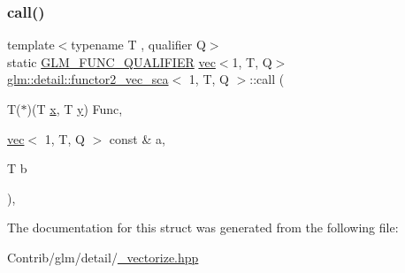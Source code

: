 \subsubsection{\texorpdfstring{call()}{call()}}
{\footnotesize\ttfamily template$<$typename T , qualifier Q$>$ \\
static \mbox{\hyperlink{setup_8hpp_a33fdea6f91c5f834105f7415e2a64407}{G\+L\+M\+\_\+\+F\+U\+N\+C\+\_\+\+Q\+U\+A\+L\+I\+F\+I\+ER}} \mbox{\hyperlink{structglm_1_1vec}{vec}}$<$1, T, Q$>$ \mbox{\hyperlink{structglm_1_1detail_1_1functor2__vec__sca}{glm\+::detail\+::functor2\+\_\+vec\+\_\+sca}}$<$ 1, T, Q $>$\+::call (\begin{DoxyParamCaption}\item[{T($\ast$)(T \mbox{\hyperlink{_s_d_l__opengl_8h_ad0e63d0edcdbd3d79554076bf309fd47}{x}}, T \mbox{\hyperlink{_s_d_l__opengl_8h_a1675d9d7bb68e1657ff028643b4037e3}{y}})}]{Func,  }\item[{\mbox{\hyperlink{structglm_1_1vec}{vec}}$<$ 1, T, Q $>$ const \&}]{a,  }\item[{T}]{b }\end{DoxyParamCaption})\hspace{0.3cm}{\ttfamily [inline]}, {\ttfamily [static]}}



The documentation for this struct was generated from the following file\+:\begin{DoxyCompactItemize}
\item 
Contrib/glm/detail/\mbox{\hyperlink{__vectorize_8hpp}{\+\_\+vectorize.\+hpp}}\end{DoxyCompactItemize}
